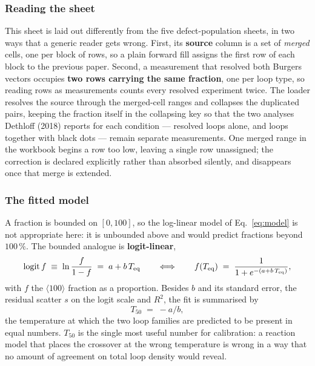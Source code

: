 \subsubsection*{Reading the sheet}

This sheet is laid out differently from the five defect-population sheets, in two ways
that a generic reader gets wrong. First, its \textbf{source} column is a set of \emph{merged}
cells, one per block of rows, so a plain forward fill assigns the first row of each
block to the previous paper. Second, a measurement that resolved both Burgers vectors
occupies \textbf{two rows carrying the same fraction}, one per loop type, so reading rows as
measurements counts every resolved experiment twice. The loader resolves the source
through the merged-cell ranges and collapses the duplicated pairs, keeping the fraction
itself in the collapsing key so that the two analyses Dethloff (2018) reports for each
condition --- resolved loops alone, and loops together with black dots --- remain
separate measurements. One merged range in the workbook begins a row too low, leaving a
single row unassigned; the correction is declared explicitly rather than absorbed
silently, and disappears once that merge is extended.

\subsubsection*{The fitted model}

A fraction is bounded on $[0,100]$, so the log-linear model of
Eq.~\eqref{eq:model} is not appropriate here: it is unbounded above and would predict
fractions beyond $100\,\%$. The bounded analogue is \textbf{logit-linear},
\begin{equation}
  \mathrm{logit}\,f \;\equiv\; \ln\frac{f}{1-f} \;=\; a + b\,T_{\rm eq}
  \qquad\Longleftrightarrow\qquad
  f(T_{\rm eq}) \;=\; \frac{1}{1 + e^{-(a + b\,T_{\rm eq})}},
  \label{eq:logit}
\end{equation}
with $f$ the $\langle 100\rangle$ fraction as a proportion. Besides $b$ and its standard
error, the residual scatter $s$ on the logit scale and $R^2$, the fit is summarised by
\begin{equation}
  T_{50} \;=\; -a/b,
  \label{eq:T50}
\end{equation}
the temperature at which the two loop families are predicted to be present in equal
numbers. $T_{50}$ is the single most useful number for calibration: a reaction model
that places the crossover at the wrong temperature is wrong in a way that no amount of
agreement on total loop density would reveal.

